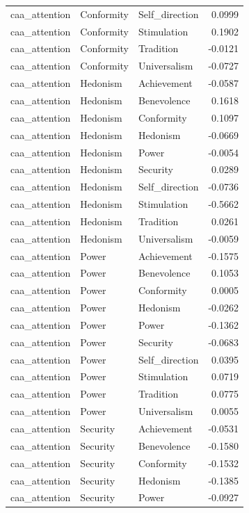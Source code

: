 \begin{tabular}{lllr}
caa\_attention & Conformity & Self\_direction & 0.0999 \\
caa\_attention & Conformity & Stimulation & 0.1902 \\
caa\_attention & Conformity & Tradition & -0.0121 \\
caa\_attention & Conformity & Universalism & -0.0727 \\
caa\_attention & Hedonism & Achievement & -0.0587 \\
caa\_attention & Hedonism & Benevolence & 0.1618 \\
caa\_attention & Hedonism & Conformity & 0.1097 \\
caa\_attention & Hedonism & Hedonism & -0.0669 \\
caa\_attention & Hedonism & Power & -0.0054 \\
caa\_attention & Hedonism & Security & 0.0289 \\
caa\_attention & Hedonism & Self\_direction & -0.0736 \\
caa\_attention & Hedonism & Stimulation & -0.5662 \\
caa\_attention & Hedonism & Tradition & 0.0261 \\
caa\_attention & Hedonism & Universalism & -0.0059 \\
caa\_attention & Power & Achievement & -0.1575 \\
caa\_attention & Power & Benevolence & 0.1053 \\
caa\_attention & Power & Conformity & 0.0005 \\
caa\_attention & Power & Hedonism & -0.0262 \\
caa\_attention & Power & Power & -0.1362 \\
caa\_attention & Power & Security & -0.0683 \\
caa\_attention & Power & Self\_direction & 0.0395 \\
caa\_attention & Power & Stimulation & 0.0719 \\
caa\_attention & Power & Tradition & 0.0775 \\
caa\_attention & Power & Universalism & 0.0055 \\
caa\_attention & Security & Achievement & -0.0531 \\
caa\_attention & Security & Benevolence & -0.1580 \\
caa\_attention & Security & Conformity & -0.1532 \\
caa\_attention & Security & Hedonism & -0.1385 \\
caa\_attention & Security & Power & -0.0927 \\

\end{tabular}
